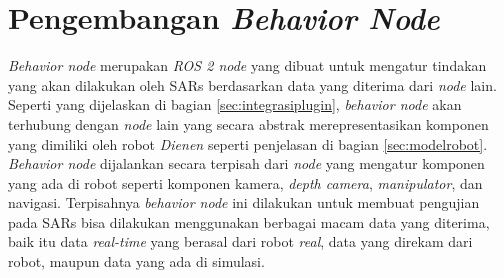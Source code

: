 \section{Pengembangan \emph{Behavior Node}}
\label{sec:behaviornode}

\emph{Behavior node} merupakan \emph{ROS 2 node} yang dibuat untuk mengatur tindakan yang akan dilakukan oleh SARs berdasarkan data yang diterima dari \emph{node} lain.
Seperti yang dijelaskan di bagian \ref{sec:integrasiplugin},
  \emph{behavior node} akan terhubung dengan \emph{node} lain yang secara abstrak merepresentasikan komponen yang dimiliki oleh robot \emph{Dienen} seperti penjelasan di bagian \ref{sec:modelrobot}.
\emph{Behavior node} dijalankan secara terpisah dari \emph{node} yang mengatur komponen yang ada di robot seperti komponen kamera, \emph{depth camera}, \emph{manipulator}, dan navigasi.
Terpisahnya \emph{behavior node} ini dilakukan untuk membuat pengujian pada SARs bisa dilakukan menggunakan berbagai macam data yang diterima,
  baik itu data \emph{real-time} yang berasal dari robot \emph{real},
  data yang direkam dari robot,
  maupun data yang ada di simulasi.

